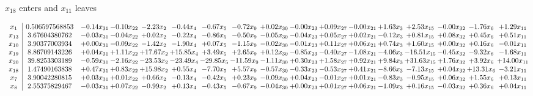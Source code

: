 \documentclass[9pt]{article}
\begin{document}
 $ x_{18} $ enters and $ x_{11} $ leaves 

 \[\begin{array}{c| c c@{\hskip 2pt} c@{\hskip 2pt} c@{\hskip 2pt} c@{\hskip 2pt} c@{\hskip 2pt} c@{\hskip 2pt} c@{\hskip 2pt} c@{\hskip 2pt} c@{\hskip 2pt} c@{\hskip 2pt} c@{\hskip 2pt} c@{\hskip 2pt} c@{\hskip 2pt} c@{\hskip 2pt} c@{\hskip 2pt} }
 x_{1}   &  0.506597568853 & -0.14 x_{31} & -0.10 x_{22} & -2.23 x_{2} & -0.44 x_{4} & -0.67 x_{5} & -0.72 x_{9} & +  0.02 x_{30} & -0.00 x_{23} & +  0.09 x_{27} & -0.00 x_{21} & +  1.63 x_{3} & +  2.53 x_{15} & -0.00 x_{32} & -1.76 x_{6} & +  1.29 x_{11}\\
 x_{13}   &  3.67604380762 & -0.03 x_{31} & -0.04 x_{22} & +  0.02 x_{2} & -0.22 x_{4} & -0.86 x_{5} & -0.50 x_{9} & -0.05 x_{30} & -0.04 x_{23} & +  0.05 x_{27} & +  0.02 x_{21} & -0.12 x_{3} & +  0.81 x_{15} & +  0.08 x_{32} & +  0.45 x_{6} & +  0.51 x_{11}\\
 x_{10}   &  3.90377003934 & +  0.00 x_{31} & -0.09 x_{22} & -1.42 x_{2} & -1.90 x_{4} & +  0.07 x_{5} & -1.15 x_{9} & -0.02 x_{30} & -0.01 x_{23} & +  0.11 x_{27} & +  0.06 x_{21} & +  0.74 x_{3} & +  1.60 x_{15} & +  0.00 x_{32} & +  0.16 x_{6} & -0.01 x_{11}\\
 x_{19}   &  8.86709143226 & +  0.04 x_{31} & +  1.11 x_{22} & + 17.67 x_{2} & + 15.85 x_{4} & +  3.49 x_{5} & +  2.65 x_{9} & +  0.12 x_{30} & -0.85 x_{23} & -0.40 x_{27} & -1.08 x_{21} & -4.06 x_{3} & -16.51 x_{15} & -0.45 x_{32} & -9.32 x_{6} & -1.68 x_{11}\\
 x_{20}   &  39.8253303189 & -0.59 x_{31} & -2.16 x_{22} & -23.53 x_{2} & -23.49 x_{4} & -29.85 x_{5} & -11.59 x_{9} & -1.11 x_{30} & +  0.30 x_{23} & +  1.58 x_{27} & +  0.92 x_{21} & +  9.84 x_{3} & + 31.63 x_{15} & +  1.76 x_{32} & +  3.92 x_{6} & + 14.00 x_{11}\\
 x_{18}   &  1.47490163838 & +  0.47 x_{31} & +  0.83 x_{22} & + 15.98 x_{2} & +  0.55 x_{4} & -7.70 x_{5} & +  5.57 x_{9} & -0.57 x_{30} & -0.33 x_{23} & -0.53 x_{27} & +  0.41 x_{21} & -8.66 x_{3} & -7.13 x_{15} & +  0.04 x_{32} & + 13.31 x_{6} & -3.21 x_{11}\\
 x_{7}   &  3.90042280815 & +  0.03 x_{31} & +  0.01 x_{22} & +  0.66 x_{2} & -0.13 x_{4} & -0.42 x_{5} & +  0.23 x_{9} & -0.09 x_{30} & +  0.04 x_{23} & -0.01 x_{27} & +  0.01 x_{21} & -0.83 x_{3} & -0.95 x_{15} & +  0.06 x_{32} & +  1.55 x_{6} & +  0.13 x_{11}\\
 x_{8}   &  2.55375829467 & -0.03 x_{31} & +  0.07 x_{22} & -0.99 x_{2} & +  0.13 x_{4} & -0.43 x_{5} & -0.67 x_{9} & -0.04 x_{30} & +  0.00 x_{23} & +  0.01 x_{27} & +  0.06 x_{21} & -1.09 x_{3} & +  0.16 x_{15} & -0.03 x_{32} & +  0.36 x_{6} & +  0.04 x_{11}\\

\end{array}\]
\end{document}
